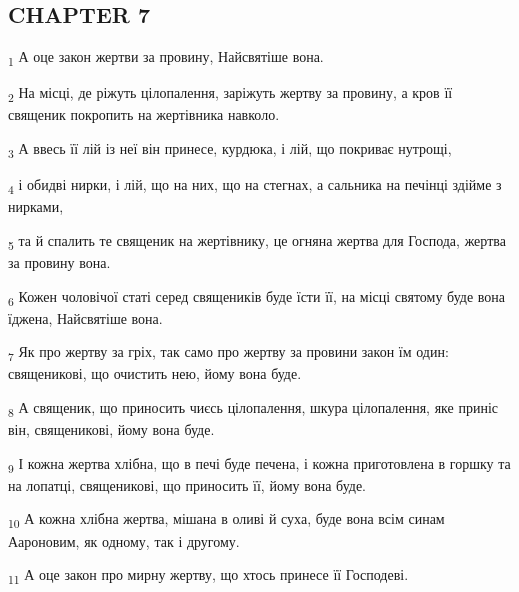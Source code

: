 \subsection{CHAPTER 7}
\begin{tcolorbox}
\textsubscript{1} А оце закон жертви за провину, Найсвятіше вона.
\end{tcolorbox}
\begin{tcolorbox}
\textsubscript{2} На місці, де ріжуть цілопалення, заріжуть жертву за провину, а кров її священик покропить на жертівника навколо.
\end{tcolorbox}
\begin{tcolorbox}
\textsubscript{3} А ввесь її лій із неї він принесе, курдюка, і лій, що покриває нутрощі,
\end{tcolorbox}
\begin{tcolorbox}
\textsubscript{4} і обидві нирки, і лій, що на них, що на стегнах, а сальника на печінці здійме з нирками,
\end{tcolorbox}
\begin{tcolorbox}
\textsubscript{5} та й спалить те священик на жертівнику, це огняна жертва для Господа, жертва за провину вона.
\end{tcolorbox}
\begin{tcolorbox}
\textsubscript{6} Кожен чоловічої статі серед священиків буде їсти її, на місці святому буде вона їджена, Найсвятіше вона.
\end{tcolorbox}
\begin{tcolorbox}
\textsubscript{7} Як про жертву за гріх, так само про жертву за провини закон їм один: священикові, що очистить нею, йому вона буде.
\end{tcolorbox}
\begin{tcolorbox}
\textsubscript{8} А священик, що приносить чиєсь цілопалення, шкура цілопалення, яке приніс він, священикові, йому вона буде.
\end{tcolorbox}
\begin{tcolorbox}
\textsubscript{9} І кожна жертва хлібна, що в печі буде печена, і кожна приготовлена в горшку та на лопатці, священикові, що приносить її, йому вона буде.
\end{tcolorbox}
\begin{tcolorbox}
\textsubscript{10} А кожна хлібна жертва, мішана в оливі й суха, буде вона всім синам Аароновим, як одному, так і другому.
\end{tcolorbox}
\begin{tcolorbox}
\textsubscript{11} А оце закон про мирну жертву, що хтось принесе її Господеві.
\end{tcolorbox}
